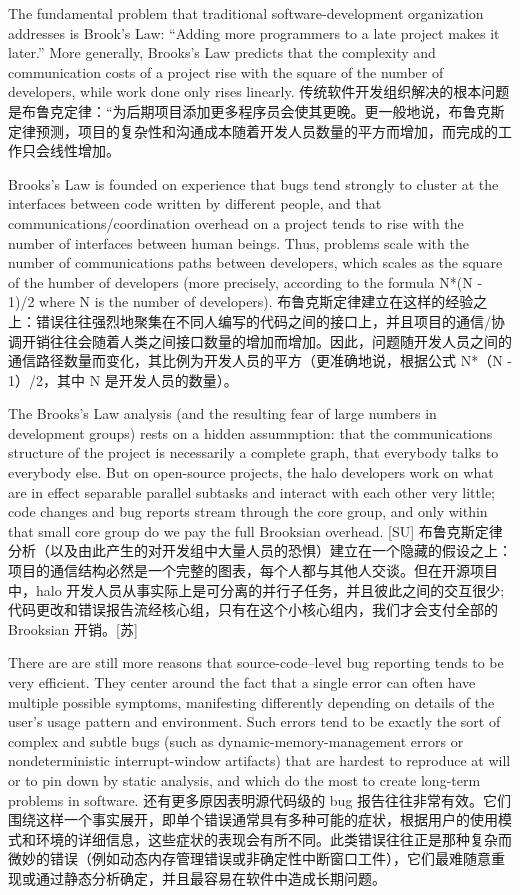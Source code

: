 \documentclass[a4paper,12pt,UTF8,twoside]{ctexbook}
\begin{document}
The fundamental problem that traditional software-development organization addresses is Brook's Law: ``Adding more programmers to a late project makes it later.'' More generally, Brooks's Law predicts that the complexity and communication costs of a project rise with the square of the number of developers, while work done only rises linearly.
传统软件开发组织解决的根本问题是布鲁克定律：“为后期项目添加更多程序员会使其更晚。更一般地说，布鲁克斯定律预测，项目的复杂性和沟通成本随着开发人员数量的平方而增加，而完成的工作只会线性增加。

Brooks's Law is founded on experience that bugs tend strongly to cluster at the interfaces between code written by different people, and that communications/coordination overhead on a project tends to rise with the number of interfaces between human beings. Thus, problems scale with the number of communications paths between developers, which scales as the square of the humber of developers (more precisely, according to the formula N*(N - 1)/2 where N is the number of developers).
布鲁克斯定律建立在这样的经验之上：错误往往强烈地聚集在不同人编写的代码之间的接口上，并且项目的通信/协调开销往往会随着人类之间接口数量的增加而增加。因此，问题随开发人员之间的通信路径数量而变化，其比例为开发人员的平方（更准确地说，根据公式 N*（N - 1）/2，其中 N 是开发人员的数量）。

The Brooks's Law analysis (and the resulting fear of large numbers in development groups) rests on a hidden assummption: that the communications structure of the project is necessarily a complete graph, that everybody talks to everybody else. But on open-source projects, the halo developers work on what are in effect separable parallel subtasks and interact with each other very little; code changes and bug reports stream through the core group, and only within that small core group do we pay the full Brooksian overhead. [SU]
布鲁克斯定律分析（以及由此产生的对开发组中大量人员的恐惧）建立在一个隐藏的假设之上：项目的通信结构必然是一个完整的图表，每个人都与其他人交谈。但在开源项目中，halo 开发人员从事实际上是可分离的并行子任务，并且彼此之间的交互很少;代码更改和错误报告流经核心组，只有在这个小核心组内，我们才会支付全部的 Brooksian 开销。[苏]

There are are still more reasons that source-code–level bug reporting tends to be very efficient. They center around the fact that a single error can often have multiple possible symptoms, manifesting differently depending on details of the user's usage pattern and environment. Such errors tend to be exactly the sort of complex and subtle bugs (such as dynamic-memory-management errors or nondeterministic interrupt-window artifacts) that are hardest to reproduce at will or to pin down by static analysis, and which do the most to create long-term problems in software.
还有更多原因表明源代码级的 bug 报告往往非常有效。它们围绕这样一个事实展开，即单个错误通常具有多种可能的症状，根据用户的使用模式和环境的详细信息，这些症状的表现会有所不同。此类错误往往正是那种复杂而微妙的错误（例如动态内存管理错误或非确定性中断窗口工件），它们最难随意重现或通过静态分析确定，并且最容易在软件中造成长期问题。
\end{document}

